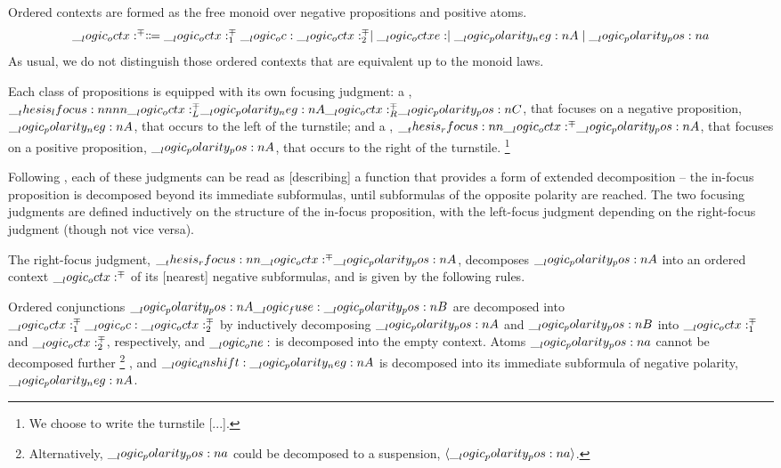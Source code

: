Ordered contexts are formed as the free monoid over negative propositions and positive atoms.
\begin{equation*}
  \__logic_octx:^{\mp} \Coloneqq \__logic_octx:^{\mp}_1 \__logic_oc: \__logic_octx:^{\mp}_2 \mid \__logic_octxe: \mid \__logic_polarity_neg:n {A} \mid \__logic_polarity_pos:n {a}
\end{equation*}
As usual, we do not distinguish those ordered contexts that are equivalent up to the monoid laws.

Each class of propositions is equipped with its own focusing judgment: a , $\__thesis_lfocus:nnnn {\__logic_octx:^{\mp}_L} {\__logic_polarity_neg:n {A}} {\__logic_octx:^{\mp}_R} {\__logic_polarity_pos:n {C}}$, that focuses on a negative proposition, $\__logic_polarity_neg:n {A}$, that occurs to the left of the turnstile; and a , $\__thesis_rfocus:nn {\__logic_octx:^{\mp}} {\__logic_polarity_pos:n {A}}$, that focuses on a positive proposition, $\__logic_polarity_pos:n {A}$, that occurs to the right of the turnstile.%
\footnote{We choose to write the turnstile [...].}

Following \textcite{Zeilberger:??}, each of these judgments can be read as [describing] a function that provides a form of extended decomposition -- the in-focus proposition is decomposed beyond its immediate subformulas, until subformulas of the opposite polarity are reached.
% 
The two focusing judgments are defined inductively on the structure of the in-focus proposition, with the left-focus judgment depending on the right-focus judgment (though not vice versa).

The right-focus judgment, $\__thesis_rfocus:nn {\__logic_octx:^{\mp}} {\__logic_polarity_pos:n {A}}$, decomposes $\__logic_polarity_pos:n {A}$ into an ordered context $\__logic_octx:^{\mp}$ of its [nearest] negative subformulas, and is given by the following rules.
Ordered conjunctions $\__logic_polarity_pos:n {A} \__logic_fuse: \__logic_polarity_pos:n {B}$ are decomposed into $\__logic_octx:^{\mp}_1 \__logic_oc: \__logic_octx:^{\mp}_2$ by inductively decomposing $\__logic_polarity_pos:n {A}$ and $\__logic_polarity_pos:n {B}$ into $\__logic_octx:^{\mp}_1$ and $\__logic_octx:^{\mp}_2$, respectively, and $\__logic_one:$ is decomposed into the empty context.
Atoms $\__logic_polarity_pos:n {a}$ cannot be decomposed further%
\footnote{Alternatively, $\__logic_polarity_pos:n {a}$ could be decomposed to a suspension, $\langle\__logic_polarity_pos:n {a}\rangle$.}%
, and $\__logic_dnshift: \__logic_polarity_neg:n {A}$ is decomposed into its immediate subformula of negative polarity, $\__logic_polarity_neg:n {A}$.

